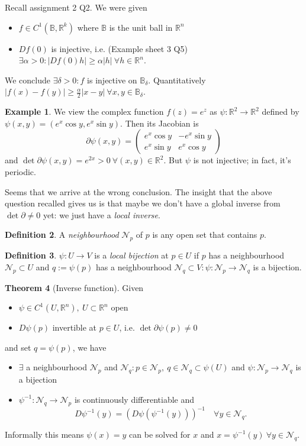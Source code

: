 \documentclass[a4paper]{article}
\theoremstyle{definition}
\newtheorem{defn}{Definition}[subsection]
\newtheorem{thm}[defn]{Theorem}
\newtheorem{eg}[defn]{Example}
\begin{document}
Recall assignment 2 Q2. We were given \begin{itemize}
    \item $f\in C^1 (\mathbb B,\mathbb R^k)$ where $\mathbb B$ is the unit ball in $\mathbb R^n$
    \item $Df(0)$ is injective, i.e. (Example sheet 3 Q5) $\exists \alpha>0: |Df(0)h| \geq \alpha |h| \ \forall h\in \mathbb R^n$.
\end{itemize}
We conclude $\exists \delta>0: f$ is injective on $\mathbb B_{\delta}$. Quantitatively $|f(x)-f(y)| \geq \frac{\alpha}{2} |x-y| \ \forall x,y\in \mathbb B_\delta$.

\begin{eg}
We view the complex function $f(z) =e^z$ as $\psi:\mathbb R^2 \rightarrow \mathbb R^2$ defined by $\psi (x,y) = \left( e^x \cos y , e^x \sin y \right)$. Then its Jacobian is
\[
\partial \psi (x,y) = \begin{pmatrix}
    e^x \cos y & -e^x \sin y \\ e^x \sin y & e^x \cos y
\end{pmatrix}
\]
and $\det \partial \psi (x,y) = e^{2x}>0 \ \forall (x,y)\in \mathbb R^2$. But $\psi$ is not injective; in fact, it's periodic.
\end{eg}
Seems that we arrive at the wrong conclusion. The insight that the above question recalled gives us is that maybe we don't have a global inverse from $\det \partial \neq 0$ yet: we just have a \textit{local inverse}.
\begin{defn}
A \textit{neighbourhood} $\mathcal N_p$ of $p$ is any open set that contains $p$.
\end{defn}
\begin{defn}
$\psi:U\rightarrow V$ is a \textit{local bijection} at $p\in U$ if $p$ has a neighbourhood $\mathcal N_p \subset U$ and $q:=\psi (p)$ has a neighbourhood $\mathcal N_q \subset V : \psi : \mathcal N_p \rightarrow \mathcal N_q$ is a bijection.
\end{defn}
\begin{thm}[Inverse function]
Given \begin{itemize}
    \item $\psi \in C^1 (U,\mathbb R^n),\ U\subset \mathbb R^n$ open
    \item $D\psi (p)$ invertible at $p\in U$, i.e. $\det \partial \psi(p)\neq 0$
\end{itemize}
and set $q=\psi(p)$, we have \begin{itemize}
    \item $\exists$ a neighbourhood $\mathcal N_p$ and $\mathcal N_q : p\in \mathcal N_p, \ q\in \mathcal N_q \subset \psi(U)$ and $\psi:\mathcal N_p \rightarrow \mathcal N_q$ is a bijection
    \item $\psi^{-1}:\mathcal N_q \rightarrow \mathcal N_p$ is continuously differentiable and
    \[
    D\psi^{-1}(y) = \left(D\psi \left(\psi^{-1}(y)\right)\right)^{-1} \quad \forall y \in \mathcal N_q .
    \tag{$\ast$}
    \]
\end{itemize}
Informally this means $\psi(x)=y$ can be solved for $x$ and $x=\psi^{-1}(y) \ \forall y \in \mathcal N_q$.
\end{thm}
\end{document}
